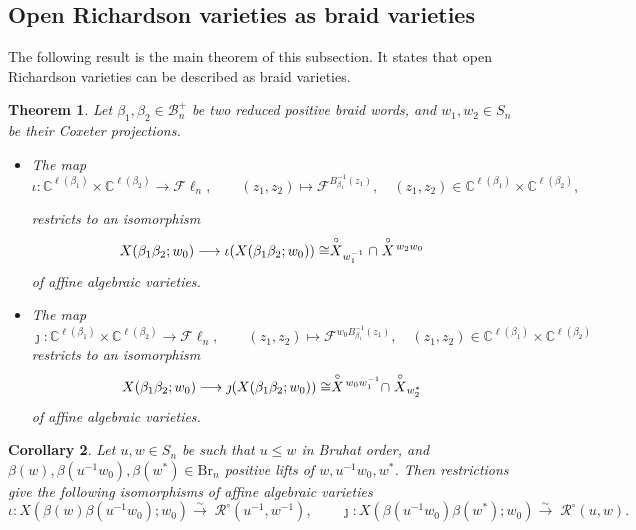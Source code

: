 \documentclass[10pt]{amsart}
\theoremstyle{plain}
\newtheorem{thm}{Theorem}[section]
\newtheorem{cor}[thm]{Corollary}
\theoremstyle{definition}
\theoremstyle{remark}
\numberwithin{equation}{section}
\newcommand{\lr}{\longrightarrow}
\newcommand{\bC}{\mathbb{C}}
\newcommand{\cB}{\mathcal{B}}
\newcommand{\cF}{\mathscr{F}}
\newcommand{\Fl}{\mathscr{F}\ell}
\newcommand{\Br}{\mathrm{Br}}
\newcommand{\schub}{\buildrel\circ \over X}
\newcommand{\rich}[2]{\mathcal{R}^{\circ}\!(#2,#1)}
\newcommand{\MG}[1]{{\color{teal}{{\bf Misha}: #1}}}
\begin{document}
\subsection{Open Richardson varieties as braid varieties}\label{ssec:Richardson_braidvar} 



The following result is the main theorem of this subsection. It states that open Richardson varieties can be described as braid varieties.

\begin{thm}\label{thm:richardson}
	Let $\beta_{1},\beta_{2}\in\cB^+_n$ be two reduced positive braid words, and $w_1,w_2\in S_n$ be their Coxeter projections. 

 \begin{itemize}
	\item[(a)] The map $$\iota:\bC^{\ell(\beta_1)}\times\bC^{\ell(\beta_2)}\lr\Fl_n,\qquad (z_1,z_2) \mapsto \cF^{B_{\beta_1}^{-1}(z_1)},\quad (z_1,z_2)\in\bC^{\ell(\beta_1)}\times\bC^{\ell(\beta_2)},$$
	
	\noindent restricts to an isomorphism
	$$X(\beta_1\beta_2; w_0) \lr \iota(X(\beta_1\beta_2; w_0))\cong\schub_{w_{1}^{-1}} \cap \schub\!^{w_2w_0}$$
	of affine algebraic varieties.\\
 
 \item[(b)] The map
 \[
 \jmath: \bC^{\ell(\beta_1)} \times \bC^{\ell(\beta_2)} \lr \Fl_n, \qquad (z_1, z_2) \mapsto \cF^{w_0B_{\beta_1}^{-1}(z_1)}, \quad (z_1, z_2) \in \bC^{\ell(\beta_1)} \times \bC^{\ell(\beta_2)}
 \]
 restricts to an isomorphism
  \[
 X(\beta_1\beta_2; w_0) \lr \jmath(X(\beta_1\beta_2; w_0)) \cong \schub\!^{w_0w_1^{-1}}\cap \schub_{w_2^*}
 \]
 of affine algebraic varieties. 
 \end{itemize}
\end{thm}

\begin{cor} \label{cor:richardson}
	Let $u, w \in S_{n}$ be such that $u \leq w$ in Bruhat order, and $\beta(w),\beta(u^{-1}w_0), \beta(w^*)\in\Br_n$ positive lifts of $w,u^{-1}w_0, w^*$. Then restrictions give the following isomorphisms of affine algebraic varieties
 \[
	     \iota: X(\beta(w)\beta(u^{-1}w_0); w_{0}) \overset\sim\to \; \rich{w^{-1}}{u^{-1}}, \qquad 
 \jmath: X(\beta(u^{-1}w_0)\beta(w^*); w_0) \overset\sim\to \; \rich{w}{u}.
	\]
\end{cor}
\end{document}
